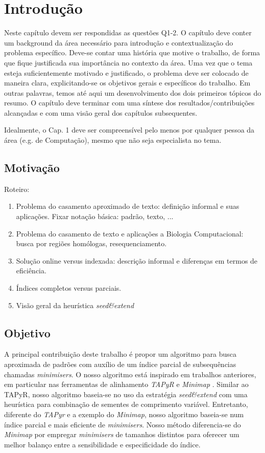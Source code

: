 \documentclass[bsc, oneside, scr, 12pt]{ufpethesis}
\newenvironment{comment}{\itshape\noindent<begin comment -- ommit this in the final version>\par}{\par\noindent<end comment>\rm}
\newcommand{\minimisers}{\textit{minimisers}\/\xspace}
\begin{document}
\chapter{Introdução}

\begin{comment}
Neste capítulo devem ser respondidas as questões Q1-2. O capítulo deve conter um background da área necessário para introdução e contextualização do problema específico. Deve-se contar uma história que motive o trabalho, de forma que fique justificada sua importância no contexto da área. Uma vez que o tema esteja suficientemente motivado e justificado, o problema deve ser colocado de maneira clara, explicitando-se os objetivos gerais e específicos do trabalho. Em outras palavras, temos até aqui um desenvolvimento dos dois primeiros tópicos do resumo. O capítulo deve terminar com uma síntese dos resultados/contribuições alcançadas e com uma visão geral dos capítulos subsequentes.

Idealmente, o Cap. 1 deve ser compreensível  pelo menos por qualquer pessoa da área (e.g. de Computação), mesmo que não seja especialista  no tema.
\end{comment}

\section{Motivação}

Roteiro:
\begin{enumerate}
\item Problema do casamento aproximado de texto: definição informal  e suas aplicações. Fixar notação básica: padrão, texto, ...
\item Problema do casamento de texto e aplicações a Biologia Computacional: busca por regiões homólogas, resequenciamento.
\item Solução online versus indexada: descrição informal e diferenças em termos de eficiência.
\item Índices completos versus parciais.
\item Visão geral da heurística \textit{seed\&extend}
\end{enumerate}

\section{Objetivo}

A principal contribuição deste trabalho é propor um algoritmo para busca aproximada de padrões com auxílio de um índice parcial de subsequências chamadas \textit{minimisers}. O nosso algoritmo está inspirado em trabalhos anteriores, em particular nas ferramentas de alinhamento \textit{TAPyR} \cite{Fernandes2011} e  \textit{Minimap} \cite{Li2016}. Similar ao TAPyR, nosso algoritmo baseia-se no uso da estratégia \textit{seed\&extend} com uma heurística para combinação de sementes de comprimento variável. Entretanto, diferente do \textit{TAPyr} e a exemplo do \textit{Minimap}, nosso algoritmo baseia-se num índice parcial e mais eficiente de \minimisers. Nosso método diferencia-se do \textit{Minimap} por empregar \minimisers de tamanhos distintos para oferecer um melhor balanço entre a sensibilidade e especificidade do índice.
\end{document}
